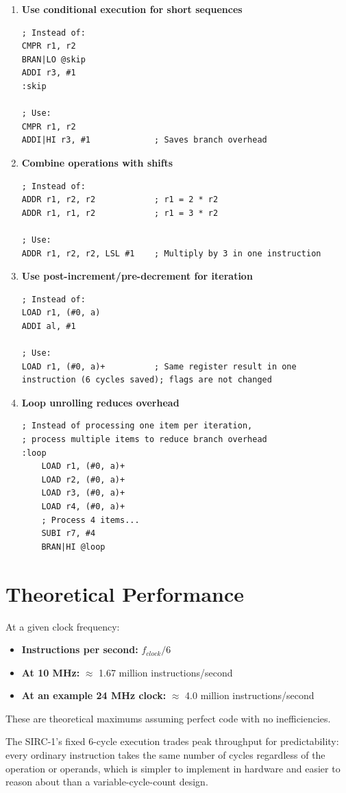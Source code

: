 \begin{enumerate}
	\item \textbf{Use conditional execution for short sequences}
	      \begin{lstlisting}
; Instead of:
CMPR r1, r2
BRAN|LO @skip
ADDI r3, #1
:skip

; Use:
CMPR r1, r2
ADDI|HI r3, #1             ; Saves branch overhead
    \end{lstlisting}

	\item \textbf{Combine operations with shifts}
	      \begin{lstlisting}
; Instead of:
ADDR r1, r2, r2            ; r1 = 2 * r2
ADDR r1, r1, r2            ; r1 = 3 * r2

; Use:
ADDR r1, r2, r2, LSL #1    ; Multiply by 3 in one instruction
    \end{lstlisting}

	\item \textbf{Use post-increment/pre-decrement for iteration}
	      \begin{lstlisting}
; Instead of:
LOAD r1, (#0, a)
ADDI al, #1

; Use:
LOAD r1, (#0, a)+          ; Same register result in one instruction (6 cycles saved); flags are not changed
    \end{lstlisting}

	\item \textbf{Loop unrolling reduces overhead}
	      \begin{lstlisting}
; Instead of processing one item per iteration,
; process multiple items to reduce branch overhead
:loop
    LOAD r1, (#0, a)+
    LOAD r2, (#0, a)+
    LOAD r3, (#0, a)+
    LOAD r4, (#0, a)+
    ; Process 4 items...
    SUBI r7, #4
    BRAN|HI @loop
    \end{lstlisting}
\end{enumerate}

\section{Theoretical Performance}

At a given clock frequency:

\begin{itemize}
	\item \textbf{Instructions per second:} $f_{clock} / 6$
	\item \textbf{At 10 MHz:} $\approx$ 1.67 million instructions/second
	\item \textbf{At an example 24 MHz clock:} $\approx$ 4.0 million instructions/second
\end{itemize}

These are theoretical maximums assuming perfect code with no inefficiencies.

The SIRC-1's fixed 6-cycle execution trades peak throughput for predictability: every ordinary instruction takes the
same number of cycles regardless of the operation or operands, which is simpler to implement in hardware and easier to
reason about than a variable-cycle-count design.
